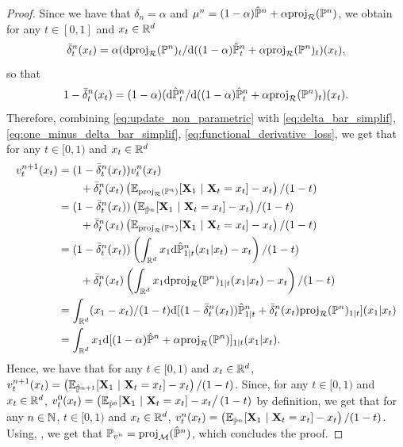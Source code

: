 \documentclass{article}
\begin{document}
\begin{proof}
Since we have that $\delta_n = \alpha$ and $\mu^n = (1-\alpha) \hat{\mathbb{P}}^n + \alpha \mathrm{proj}_{\mathcal{R}}(\mathbb{P}^n)$, we obtain for any $t \in [0,1]$ and $x_t \in \mathbb{R}^d$ 
\begin{equation}
\label{eq:delta_bar_simplif}
    \bar{\delta}^n_t(x_t) = \alpha (\rmd \projsimpleR(\Pbb^n)_t / \rmd ( (1-\alpha) \hat{\Pbb}^n_t + \alpha \projsimpleR(\Pbb^n)_t)(x_t),
\end{equation}
so that
\begin{equation}
\label{eq:one_minus_delta_bar_simplif}
    1 - \bar{\delta}^n_t(x_t) = (1-\alpha) (\rmd \hat{\Pbb}^n_t /  \rmd ( (1-\alpha) \hat{\Pbb}^n_t + \alpha \projsimpleR(\Pbb^n)_t)(x_t) .
\end{equation}
Therefore, combining \eqref{eq:update_non_parametric} with \eqref{eq:delta_bar_simplif}, \eqref{eq:one_minus_delta_bar_simplif}, \eqref{eq:functional_derivative_loss}, we get that for any $t \in [0,1)$ and $x_t \in \mathbb{R}^d$
\begin{align}
    v_t^{n+1}(x_t) & =(1 - \bar{\delta}_t^n(x_t))v_t^{n}(x_t) \\
    & \qquad + \bar{\delta}^n_t(x_t) \left(\mathbb{E}_{\mathrm{proj}_{\mathcal{R}}(\mathbb{P}^n)}[\mathbf{X}_1 \ | \ \mathbf{X}_t=x_t] - x_t\right)/(1-t) \\
    &=(1 - \bar{\delta}_t^n(x_t)) \left(\mathbb{E}_{\hat{\mathbb{P}}^n}[\mathbf{X}_1 \ | \ \mathbf{X}_t=x_t] - x_t\right)/(1-t) \\
    & \qquad + \bar{\delta}^n_t(x_t) \left(\mathbb{E}_{\mathrm{proj}_{\mathcal{R}}(\mathbb{P}^n)}[\mathbf{X}_1 \ | \ \mathbf{X}_t=x_t] - x_t\right)/(1-t) \\
    &=  (1 - \bar{\delta}_t^n(x_t)) \left(\int_{\mathbb{R}^d} x_1 \mathrm{d} \hat{\mathbb{P}}^n_{1|t}(x_1 | x_t) - x_t\right) / (1-t) \\
    & \qquad + \bar{\delta}^n_t(x_t) \left(\int_{\mathbb{R}^d} x_1 \mathrm{d} \mathrm{proj}_{\mathcal{R}}(\mathbb{P}^n)_{1|t}(x_1 | x_t) - x_t\right) / (1-t) \\
    &=  \int_{\mathbb{R}^d} (x_1 - x_t) / (1-t) \mathrm{d} [ (1 - \bar{\delta}_t^n(x_t)) \hat{\mathbb{P}}^n_{1|t}+ \bar{\delta}_t^n(x_t) \mathrm{proj}_{\mathcal{R}}(\mathbb{P}^n)_{1|t}] (x_1 | x_t) \\
    &=  \int_{\mathbb{R}^d} x_1 \mathrm{d} [ (1-\alpha) \hat{\mathbb{P}}^n+ \alpha \mathrm{proj}_{\mathcal{R}}(\mathbb{P}^n)]_{1|t} (x_1 | x_t) . 
\end{align}
Hence, we have that for any $t \in [0,1)$ and $x_t \in \mathbb{R}^d$, $v_t^{n+1}(x_t) = \left(\mathbb{E}_{\hat{\mathbb{P}}^{n+1}}[\mathbf{X}_1  \ | \ \mathbf{X}_t = x_t] - x_t\right)/(1-t)$. Since, for any $t \in [0,1)$ and $x_t \in \mathbb{R}^d$, $v_t^0(x_t) = \left(\mathbb{E}_{\hat{\mathbb{P}}^{0}}[\mathbf{X}_1  \ | \ \mathbf{X}_t = x_t] - x_t\right / (1-t)$ by definition, we get that for any $n \in \mathbb{N}$, $t \in [0,1)$ and $x_t \in \mathbb{R}^d$,  $v_t^{n}(x_t) = \left(\mathbb{E}_{\hat{\mathbb{P}}^{n}}[\mathbf{X}_1  \ | \ \mathbf{X}_t = x_t] - x_t\right) / (1-t)$. Using, , we get that $\mathbb{P}_{v^n} = \mathrm{proj}_{\mathcal{M}}(\hat{\mathbb{P}}^n)$, which concludes the proof. 
\end{proof}
\end{document}
